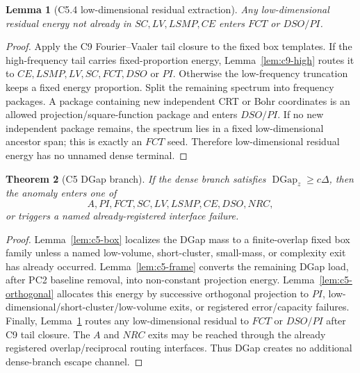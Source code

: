 \documentclass[11pt]{article}
\newtheorem{theorem}{Theorem}[section]
\newtheorem{lemma}[theorem]{Lemma}
\theoremstyle{definition}
\newcommand{\DGap}{\operatorname{DGap}}
\begin{document}
\begin{lemma}[C5.4 low-dimensional residual extraction]\label{lem:c5-lowdim}
Any low-dimensional residual energy not already in $SC,LV,LSMP,CE$ enters $FCT$ or $DSO/PI$.
\end{lemma}
\begin{proof}
Apply the C9 Fourier--Vaaler tail closure to the fixed box templates.  If the high-frequency tail carries fixed-proportion energy, Lemma~\ref{lem:c9-high} routes it to $CE,LSMP,LV,SC,FCT,DSO$ or $PI$.  Otherwise the low-frequency truncation keeps a fixed energy proportion.  Split the remaining spectrum into frequency packages.  A package containing new independent CRT or Bohr coordinates is an allowed projection/square-function package and enters $DSO/PI$.  If no new independent package remains, the spectrum lies in a fixed low-dimensional ancestor span; this is exactly an $FCT$ seed.  Therefore low-dimensional residual energy has no unnamed dense terminal.
\end{proof}

\begin{theorem}[C5 DGap branch]\label{thm:c5}
If the dense branch satisfies $\DGap_z\ge c\Delta$, then the anomaly enters one of
\[
  A,PI,FCT,SC,LV,LSMP,CE,DSO,NRC,
\]
or triggers a named already-registered interface failure.
\end{theorem}
\begin{proof}
Lemma~\ref{lem:c5-box} localizes the DGap mass to a finite-overlap fixed box family unless a named low-volume, short-cluster, small-mass, or complexity exit has already occurred.  Lemma~\ref{lem:c5-frame} converts the remaining DGap load, after PC2 baseline removal, into non-constant projection energy.  Lemma~\ref{lem:c5-orthogonal} allocates this energy by successive orthogonal projection to $PI$, low-dimensional/short-cluster/low-volume exits, or registered error/capacity failures.  Finally, Lemma~\ref{lem:c5-lowdim} routes any low-dimensional residual to $FCT$ or $DSO/PI$ after C9 tail closure.  The $A$ and $NRC$ exits may be reached through the already registered overlap/reciprocal routing interfaces.  Thus DGap creates no additional dense-branch escape channel.
\end{proof}
\end{document}
